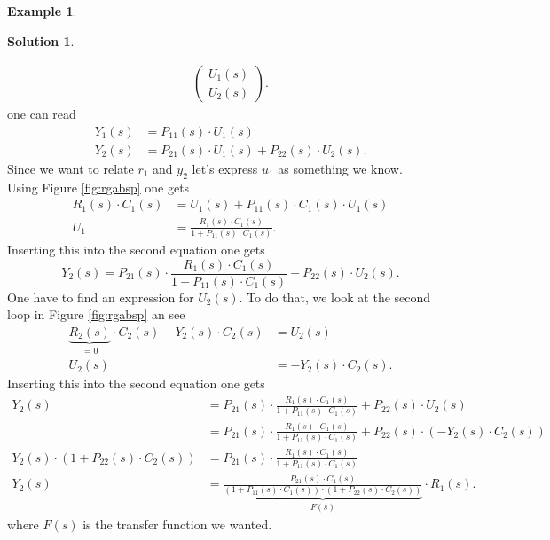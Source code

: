 \documentclass[a4paper,12 pt]{article}
\numberwithin{equation}{section}
\theoremstyle{definition}
\newtheorem{bsp}{Example}
\theoremstyle{remark}
\theoremstyle{definition}
\newtheorem*{lsg}{Solution}
\theoremstyle{definition}
\theoremstyle{definition}
\theoremstyle{remark}
\begin{document}
\begin{bsp}
\begin{lsg}
\begin{enumerate}[(a)]
\begin{equation*}
\begin{split}
\begin{pmatrix}
U_1(s)\\
U_2(s)
\end{pmatrix}.
\end{split}
\end{equation*}
one can read
\begin{equation*}
\begin{split}
Y_1(s)&=P_{11}(s)\cdot U_1(s)\\
Y_2(s)&=P_{21}(s)\cdot U_1(s)+P_{22}(s)\cdot U_2(s).
\end{split}
\end{equation*}
Since we want to relate $r_1$ and $y_2$ let's express $u_1$ as something we know. \\ Using Figure \ref{fig:rgabsp} one gets
\begin{equation*}
\begin{split}
R_1(s)\cdot C_1(s)&=U_1(s)+P_{11}(s)\cdot C_1(s)\cdot U_1(s)\\
U_1&=\frac{R_1(s)\cdot C_1(s)}{1+P_{11}(s)\cdot C_1(s)}.
\end{split}
\end{equation*}
Inserting this into the second equation one gets
\begin{equation*}
Y_2(s)=P_{21}(s)\cdot \frac{R_1(s)\cdot C_1(s)}{1+P_{11}(s)\cdot C_1(s)}+P_{22}(s)\cdot U_2(s).
\end{equation*}
One have to find an expression for $U_2(s)$. To do that, we look at the second loop in Figure \ref{fig:rgabsp} an see
\begin{equation*}
\begin{split}
\underbrace{R_2(s)}_{=0}\cdot C_2(s)-Y_2(s)\cdot C_2(s)&=U_2(s)\\
U_2(s)&=-Y_2(s)\cdot C_2(s).
\end{split}
\end{equation*}
Inserting this into the second equation one gets
\begin{equation*}
\begin{split}
Y_2(s)&=P_{21}(s)\cdot \frac{R_1(s)\cdot C_1(s)}{1+P_{11}(s)\cdot C_1(s)}+P_{22}(s)\cdot U_2(s)\\
&=P_{21}(s)\cdot \frac{R_1(s)\cdot C_1(s)}{1+P_{11}(s)\cdot C_1(s)}+P_{22}(s)\cdot (-Y_2(s)\cdot C_2(s))\\
Y_2(s)\cdot (1+P_{22}(s)\cdot C_2(s))&=P_{21}(s)\cdot \frac{R_1(s)\cdot C_1(s)}{1+P_{11}(s)\cdot C_1(s)}\\
Y_2(s)&=\underbrace{\frac{P_{21}(s)\cdot C_1(s)}{(1+P_{11}(s)\cdot C_1(s))\cdot(1+P_{22}(s)\cdot C_2(s))}}_{F(s)}\cdot R_1(s).
\end{split}
\end{equation*}
where $F(s)$ is the transfer function we wanted.


\end{enumerate}

\end{lsg}

\end{bsp}
\end{document}
